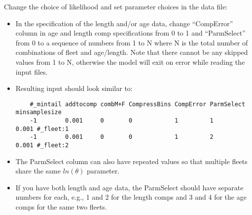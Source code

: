 Change the choice of likelihood and set parameter choices in the data
file: 
\begin{itemize}
	\item In the specification of the length and/or age data, change
	``CompError'' column in age and length comp specifications from 0 to 1 and
	``ParmSelect'' from 0 to a sequence of numbers from 1 to N where N is the
	total number of combinations of fleet and age/length. Note that there
	cannot be any skipped values from 1 to N, otherwise the model will exit
	on error while reading the input files. 	
	\item Resulting input should look similar to:
	\begin{small}
	\begin{verbatim}
	#_mintail addtocomp combM+F CompressBins CompError ParmSelect minsamplesize   
	-1        0.001     0       0            1         1          0.001 #_fleet:1
	-1        0.001     0       0            1         2          0.001 #_fleet:2
	\end{verbatim}
	\end{small}
	\item The ParmSelect column can also have repeated values so that
	multiple fleets share the same $ln(\theta)$ parameter. 	
	\item If you have both length and age data, the ParmSelect should have
	separate numbers for each, e.g., 1 and 2 for the length comps and 3 and 4
	for the age comps for the same two fleets. 	
\end{itemize}

